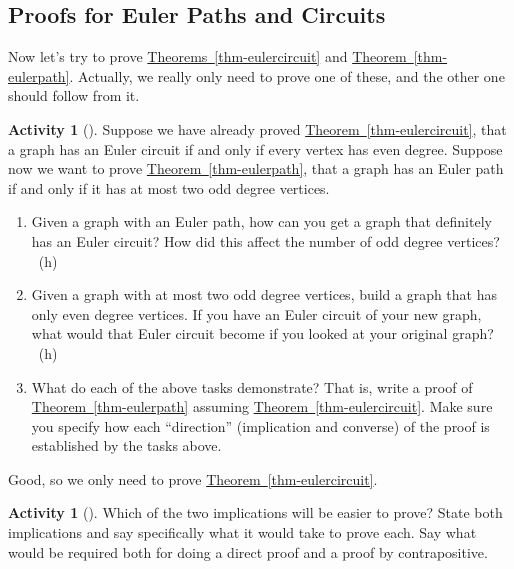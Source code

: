 \documentclass[10pt,]{book}
\theoremstyle{plain}
\theoremstyle{definition}
\theoremstyle{definition}
\theoremstyle{definition}
\newtheorem{activity}[project]{Activity}
\numberwithin{equation}{chapter}
\begin{document}
\subsection[{Proofs for Euler Paths and Circuits}]{Proofs for Euler Paths and Circuits}\label{subsection-3}
\hypertarget{p-178}{}%
Now let's try to prove \hyperref[thm-eulercircuit]{Theorems~\ref{thm-eulercircuit}} and \hyperref[thm-eulerpath]{Theorem~\ref{thm-eulerpath}}.  Actually, we really only need to prove one of these, and the other one should follow from it.%
\begin{activity}[]\label{activity-10}
\hypertarget{p-179}{}%
Suppose we have already proved \hyperref[thm-eulercircuit]{Theorem~\ref{thm-eulercircuit}}, that a graph has an Euler circuit if and only if every vertex has even degree.  Suppose now we want to prove \hyperref[thm-eulerpath]{Theorem~\ref{thm-eulerpath}}, that a graph has an Euler path if and only if it has at most two odd degree vertices.%
\begin{enumerate}[font=\bfseries,label=(\alph*),ref=\alph*]
\item\label{task-13} \hypertarget{p-180}{}%
Given a graph with an Euler path, how can you get a graph that definitely has an Euler circuit?  How did this affect the number of odd degree vertices?%
~{\tiny (h)}\item\label{task-14} \hypertarget{p-182}{}%
Given a graph with at most two odd degree vertices, build a graph that has only even degree vertices.  If you have an Euler circuit of your new graph, what would that Euler circuit become if you looked at your original graph?%
~{\tiny (h)}\item\label{task-15} \hypertarget{p-184}{}%
What do each of the above tasks demonstrate?  That is, write a proof of \hyperref[thm-eulerpath]{Theorem~\ref{thm-eulerpath}} assuming \hyperref[thm-eulercircuit]{Theorem~\ref{thm-eulercircuit}}.  Make sure you specify how each ``direction'' (implication and converse) of the proof is established by the tasks above.%
\end{enumerate}
\end{activity}
\hypertarget{p-185}{}%
Good, so we only need to prove \hyperref[thm-eulercircuit]{Theorem~\ref{thm-eulercircuit}}.%
\begin{activity}[]\label{activity-11}
\hypertarget{p-186}{}%
Which of the two implications will be easier to prove?  State both implications and say specifically what it would take to prove each.  Say what would be required both for doing a direct proof and a proof by contrapositive.%
\end{activity}
\end{document}
